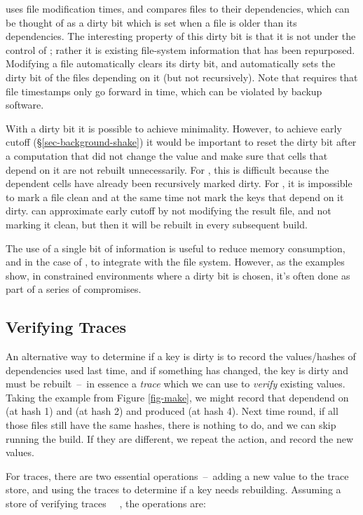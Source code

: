 \Make uses file modification times, and compares files to their dependencies,
which can be thought of as a dirty bit which is set when a file is older than
its dependencies. The interesting property of this dirty bit is that it is not
under the control of \Make; rather it is existing file-system information that
has been repurposed. Modifying a file automatically clears its dirty bit, and
automatically sets the dirty bit of the files depending on it (but not
recursively). Note that \Make requires that file timestamps only go forward in
time, which can be violated by backup software.

With a dirty bit it is possible to achieve minimality. However, to achieve early
cutoff (\S\ref{sec-background-shake}) it would be important to reset the dirty
bit after a computation that did not change the value and make sure that cells
that depend on it are not rebuilt unnecessarily. For \Excel, this is difficult
because the dependent cells have already been recursively marked dirty. For
\Make, it is impossible to mark a file clean and at the same time not mark the
keys that depend on it dirty. \Make can approximate early cutoff by not
modifying the result file, and not marking it clean, but then it will be rebuilt
in every subsequent build.

The use of a single bit of information is useful to reduce memory consumption, and
in the case of \Make, to integrate with the file system. However, as the examples show,
in constrained environments where a dirty bit is chosen, it's often done as part of
a series of compromises.

\subsection{Verifying Traces}\label{sec-verifying-traces}

An alternative way to determine if a key is dirty is to record the
values/hashes of dependencies used last time, and if something has changed, the
key is dirty and must be rebuilt~--~in essence a \emph{trace} which we can use
to \emph{verify} existing values. Taking the example from Figure \ref{fig-make},
we might record that  dependend on  (at hash 1) and 
(at hash 2) and produced  (at hash 4). Next time round, if all those files
still have the same hashes, there is nothing to do, and we can skip running the build.
If they are different, we repeat the action, and record the new values.

For traces, there are two essential
operations~--~adding a new value to the trace store, and using the traces to
determine if a key needs rebuilding. Assuming a store of verifying traces
~~, the operations are:

